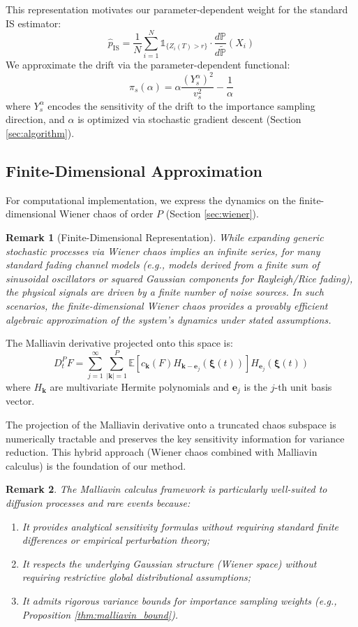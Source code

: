 \documentclass[11pt]{article}
\newtheorem{remark}{Remark}
\begin{document}
This representation motivates our parameter-dependent weight for the standard IS estimator:
$$
\hat{p}_{\text{IS}} = \frac{1}{N} \sum_{i=1}^N \mathds{1}_{\{Z_i(T) > r\}} \cdot \frac{d\mathbb{P}}{d\widetilde{\mathbb{P}}}(X_i)
$$
We approximate the drift via the parameter-dependent functional:
$$
\pi_s(\alpha) = \alpha \frac{(Y_s^\alpha)^2}{v_s^2} - \frac{1}{\alpha}
$$
where $Y_s^\alpha$ encodes the sensitivity of the drift to the importance sampling direction, and $\alpha$ is optimized via stochastic gradient descent (Section \ref{sec:algorithm}).

\subsection{Finite-Dimensional Approximation}

For computational implementation, we express the dynamics on the finite-dimensional Wiener chaos of order $P$ (Section \ref{sec:wiener}).

\begin{remark}[Finite-Dimensional Representation]
While expanding generic stochastic processes via Wiener chaos implies an infinite series, for many standard fading channel models (e.g., models derived from a finite sum of sinusoidal oscillators or squared Gaussian components for Rayleigh/Rice fading), the physical signals are driven by a finite number of noise sources. In such scenarios, the finite-dimensional Wiener chaos provides a provably efficient algebraic approximation of the system's dynamics under stated assumptions.
\end{remark}

The Malliavin derivative projected onto this space is:
$$
D_t^P F = \sum_{j=1}^{\infty} \sum_{|\mathbf{k}|=1}^P \mathbb{E}[c_\mathbf{k}(F) H_{\mathbf{k}-\mathbf{e}_j}(\boldsymbol{\xi}(t))] H_{\mathbf{e}_j}(\boldsymbol{\xi}(t))
$$
where $H_{\mathbf{k}}$ are multivariate Hermite polynomials and $\mathbf{e}_j$ is the $j$-th unit basis vector.

The projection of the Malliavin derivative onto a truncated chaos subspace is numerically tractable and preserves the key sensitivity information for variance reduction. This hybrid approach (Wiener chaos combined with Malliavin calculus) is the foundation of our method.

\begin{remark}
The Malliavin calculus framework is particularly well-suited to diffusion processes and rare events because:
\begin{enumerate}
    \item It provides analytical sensitivity formulas without requiring standard finite differences or empirical perturbation theory;
    \item It respects the underlying Gaussian structure (Wiener space) without requiring restrictive global distributional assumptions;
    \item It admits rigorous variance bounds for importance sampling weights (e.g., Proposition \ref{thm:malliavin_bound}).
\end{enumerate}
\end{remark}
\end{document}
